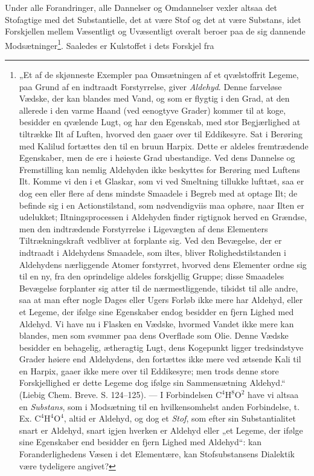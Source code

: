 \documentclass[12pt,a4paper]{book}
\begin{document}
Under alle Forandringer, alle Dannelser og Omdannelser
vexler altsaa det Stofagtige med det Substantielle, det at
være Stof og det at være Substans, idet Forskjellen mellem
Væsentligt og Uvæsentligt overalt beroer paa de sig dannende
Modsætninger\footnote{„Et af de skjønneste Exempler paa
Omsætningen af et qvælstoffrit Legeme, paa Grund af en indtraadt
Forstyrrelse, giver \emph{Aldehyd}. Denne farveløse Vædske, der
kan blandes med Vand, og som er flygtig i den Grad, at den
allerede i den varme Haand (ved eenogtyve Grader) kommer til at
koge, besidder en qvælende Lugt, og har den Egenskab, med stor
Begjærlighed at tiltrække Ilt af Luften, hvorved den gaaer over
til Eddikesyre. Sat i Berøring med Kalilud fortættes den til en
bruun Harpix. Dette er aldeles fremtrædende Egenskaber, men de
ere i høieste Grad ubestandige. Ved dens Dannelse og Fremstilling
kan nemlig Aldehyden ikke beskyttes for Berøring med Luftens Ilt.
Komme vi den i et Glaskar, som vi ved Smeltning tillukke lufttæt,
saa er dog een eller flere af dens mindste Smaadele i Begreb med
at optage Ilt; de befinde sig i en Actionstilstand, som
nødvendigviis maa ophøre, naar Ilten er udelukket;
Iltningsprocessen i Aldehyden finder rigtignok herved en Grændse,
men den indtrædende Forstyrrelse i Ligevægten af dens Elementers
Tiltrækningskraft vedbliver at forplante sig. Ved den Bevægelse,
der er indtraadt i Aldehydens Smaadele, som iltes, bliver
Rolighedstilstanden i Aldehydens nærliggende Atomer forstyrret,
hvorved dens Elementer ordne sig til en ny, fra den oprindelige
aldeles forskjellig Gruppe; disse Smaadeles Bevægelse forplanter
sig atter til de nærmestliggende, tilsidst til alle andre, saa at
man efter nogle Dages eller Ugers Forløb ikke mere har Aldehyd,
eller et Legeme, der ifølge sine Egenskaber endog besidder en
fjern Lighed med Aldehyd. Vi have nu i Flasken en Vædske,
hvormed Vandet ikke mere kan blandes, men som svømmer paa dens
Overflade som Olie. Denne Vædske besidder en behagelig,
ætheragtig Lugt, dens Kogepunkt ligger tredsindstyve Grader
høiere end Aldehydens, den fortættes ikke mere ved ætsende Kali
til en Harpix, gaaer ikke mere over til Eddikesyre; men trods
denne store Forskjellighed er dette Legeme dog ifølge sin
Sammensætning Aldehyd.“ (Liebig Chem. Breve. S. 124--125). ---
I Forbindelsen $\mathrm{C}^4\mathrm{H}^8\mathrm{O}^2$ have vi altsaa en
\emph{Substans}, som i Modsætning til en hvilkensomhelst anden
Forbindelse, t. Ex. $\mathrm{C}^4\mathrm{H}^4\mathrm{O}^4$, altid er Aldehyd,
og dog et \emph{Stof}, som efter sin Substantialitet snart er
Aldehyd, snart igjen hverken er Aldehyd eller „et Legeme, der
ifølge sine Egenskaber end besidder en fjern Lighed med
Aldehyd“: kan Foranderlighedens Væsen i det Elementære, kan
Stofsubstansens Dialektik være tydeligere
angivet?}. Saaledes er Kulstoffet i dets Forskjel fra
\end{document}
